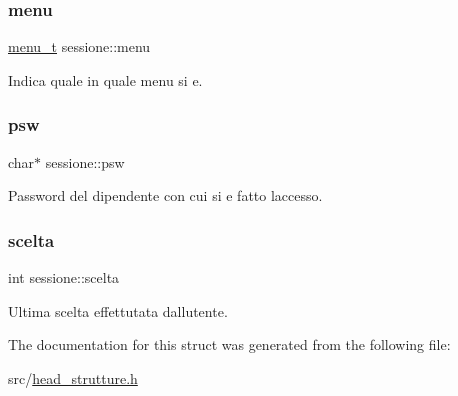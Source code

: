 \subsubsection{\texorpdfstring{menu}{menu}}
{\footnotesize\ttfamily \hyperlink{head__strutture_8h_a27938a0a874a833cfee26456c5d730b1}{menu\+\_\+t} sessione\+::menu}

Indica quale in quale menu\textquotesingle{} si e\textquotesingle{}. \mbox{\label{structsessione_a7db36e3c06e5950e589fe1af8f6deb0d}} 
\subsubsection{\texorpdfstring{psw}{psw}}
{\footnotesize\ttfamily char$\ast$ sessione\+::psw}

Password del dipendente con cui si e\textquotesingle{} fatto l\textquotesingle{}accesso. \mbox{\label{structsessione_a8b53563de0ac5e415e1c596b97f0cece}} 
\subsubsection{\texorpdfstring{scelta}{scelta}}
{\footnotesize\ttfamily int sessione\+::scelta}

Ultima scelta effettutata dall\textquotesingle{}utente. 

The documentation for this struct was generated from the following file\+:\begin{DoxyCompactItemize}
\item 
src/\hyperlink{head__strutture_8h}{head\+\_\+strutture.\+h}\end{DoxyCompactItemize}
